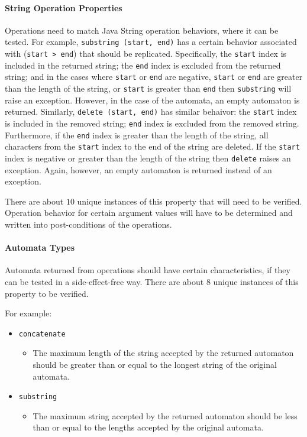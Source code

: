 \documentclass[letterpaper,11pt,twocolumn]{article}
\begin{document}
\paragraph{String Operation Properties} Operations need to match Java String
operation behaviors, where it can be tested.  For example,
\texttt{substring~(start, end)} has a certain behavior associated with
(\texttt{start > end}) that should be replicated.  Specifically, the
\texttt{start} index is included in the returned string; the \texttt{end} index
is excluded from the returned string; and in the cases where \texttt{start} or
\texttt{end} are negative, \texttt{start} or \texttt{end} are greater than the
length of the string, or \texttt{start} is greater than \texttt{end} then
\texttt{substring} will raise an exception.  However, in the case of the
automata, an empty automaton is returned.  Similarly, \texttt{delete~(start,
  end)} has similar behaivor: the \texttt{start} index is included in the
removed string; \texttt{end} index is excluded from the removed string.
Furthermore, if the \texttt{end} index is greater than the length of the
string, all characters from the \texttt{start} index to the end of the string
are deleted.  If the \texttt{start} index is negative or greater than the
length of the string then \texttt{delete} raises an exception.  Again, however,
an empty automaton is returned instead of an exception.

There are about \(10\) unique instances of this property that will need to be
verified.  Operation behavior for certain argument values will have to be
determined and written into post-conditions of the operations.

\paragraph{Automata Types} Automata returned from operations should have certain
characteristics, if they can be tested in a side-effect-free way.  There are
about \(8\) unique instances of this property to be verified.

For example:

\begin{itemize}
\item{\texttt{concatenate}}
  \begin{itemize}
  \item{The maximum length of the string accepted by the returned automaton
      should be greater than or equal to the longest string of the original
      automata.}
  \end{itemize}
\item{\texttt{substring}}
  \begin{itemize}
  \item{The maximum string accepted by the returned automaton should be less
      than or equal to the lengths accepted by the original automata.}
  \end{itemize}
\end{itemize}
\end{document}
